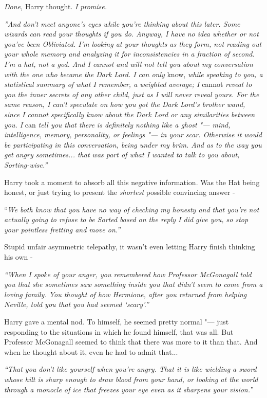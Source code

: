 \emph{Done,} Harry thought. \emph{I promise.}

\emph{''And don't meet anyone's eyes while you're thinking about this
later. Some wizards can read your thoughts if you do. Anyway, I have no
idea whether or not you've been Obliviated. I'm looking at your thoughts
as they form, not reading out your whole memory and analyzing it for
inconsistencies in a fraction of second. I'm a hat, not a god. And I
cannot and will not tell you about my conversation with the one who
became the Dark Lord. I can only} know, \emph{while speaking to you, a
statistical summary of what I remember, a weighted average; I} cannot
\emph{reveal to you the inner secrets of any other child, just as I will
never reveal yours. For the same reason, I can't speculate on how you
got the Dark Lord's brother wand, since I cannot specifically know about
the Dark Lord or any similarities between you. I} can \emph{tell you
that there is definitely nothing like a ghost "--- mind, intelligence,
memory, personality, or feelings "--- in your scar. Otherwise it would be
participating in this conversation, being under my brim. And as to the
way you get angry sometimes... that was part of what I wanted to
talk to you about, Sorting-wise.''}

Harry took a moment to absorb all this negative information. Was the Hat
being honest, or just trying to present the \emph{shortest} possible
convincing answer -

``\emph{We both know that you have no way of checking my honesty and that
you're not actually going to refuse to be Sorted based on the reply I
did give you, so stop your pointless fretting and move on.''}

Stupid unfair asymmetric telepathy, it wasn't even letting Harry finish
thinking his own -

\emph{``When I spoke of your anger, you remembered how Professor
McGonagall told you that she sometimes saw something inside you that
didn't seem to come from a loving family. You thought of how Hermione,
after you returned from helping Neville, told you that you had seemed
`scary'.''}

Harry gave a mental nod. To himself, he seemed pretty normal "--- just
responding to the situations in which he found himself, that was all.
But Professor McGonagall seemed to think that there was more to it than
that. And when he thought about it, even he had to admit that...

\emph{``That you don't like yourself when you're angry. That it is like
wielding a sword whose hilt is sharp enough to draw blood from your
hand, or looking at the world through a monocle of ice that freezes your
eye even as it sharpens your vision.''}

